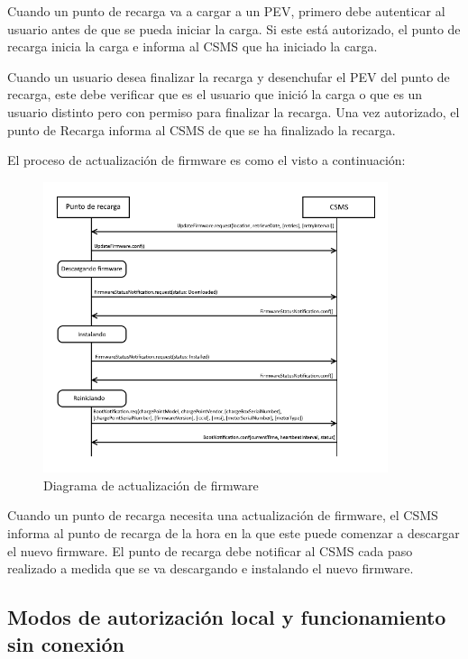 \documentclass[12pt,a4paper,onecolumn,oneside]{report}
\begin{document}
Cuando un punto de recarga va a cargar a un PEV, primero debe autenticar al usuario antes de que se pueda iniciar la carga. Si este está autorizado, el punto de recarga inicia la carga e informa al CSMS que ha iniciado la carga.

Cuando un usuario desea finalizar la recarga y desenchufar el PEV del punto de recarga, este debe verificar que es el usuario que inició la carga o que es un usuario distinto pero con permiso para finalizar la recarga. Una vez autorizado, el punto de Recarga informa al CSMS de que se ha finalizado la recarga.

El proceso de actualización de firmware es como el visto a continuación:

\begin{figure}[h] 
\centering
  \includegraphics[width=0.9\textwidth]{figuras/diagramaactualizacionfirmware.png}
  \caption[Diagrama de actualización de firmware]{Diagrama de actualización de firmware\\
  }
  \label{fig:diagramaactualizacionfirmware}
\end{figure}

Cuando un punto de recarga necesita una actualización de firmware, el CSMS informa al punto de recarga de la hora en la que este puede comenzar a descargar el nuevo firmware. El punto de recarga debe notificar al CSMS cada paso realizado a medida que se va descargando e instalando el nuevo firmware.

\subsection{Modos de autorización local y funcionamiento sin conexión}
\label{Modos de autorización local y funcionamiento sin conexión}
\end{document}
